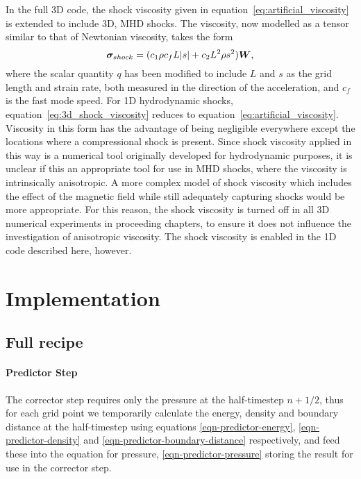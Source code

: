 In the full 3D code, the shock viscosity given in equation~\ref{eq:artificial_viscosity} is extended to include 3D, MHD shocks. The viscosity, now modelled as a tensor similar to that of Newtonian viscosity, takes the form
\begin{equation}
  \label{eq:3d_shock_viscosity}
{\bm \sigma}_{shock} = (c_1 \rho c_f L |s| + c_2 L^2 \rho s^2) {\bm W},
\end{equation}
where the scalar quantity $q$ has been modified to include $L$ and $s$ as the grid length and strain rate, both measured in the direction of the acceleration, and $c_f$ is the fast mode speed. For 1D hydrodynamic shocks, equation~\ref{eq:3d_shock_viscosity} reduces to equation~\ref{eq:artificial_viscosity}. Viscosity in this form has the advantage of being negligible everywhere except the locations where a compressional shock is present. Since shock viscosity applied in this way is a numerical tool originally developed for hydrodynamic purposes, it is unclear if this an appropriate tool for use in MHD shocks, where the viscosity is intrinsically anisotropic. A more complex model of shock viscosity which includes the effect of the magnetic field while still adequately capturing shocks would be more appropriate. For this reason, the shock viscosity is turned off in all 3D numerical experiments in proceeding chapters, to ensure it does not influence the investigation of anisotropic viscosity. The shock viscosity is enabled in the 1D code described here, however.

\section{Implementation}
\subsection{Full recipe}
\paragraph{Predictor Step}
The corrector step requires only the pressure at the half-timestep $n+1/2$, thus for each grid point we temporarily calculate the energy, density and boundary distance at the half-timestep using equations \eqref{eqn-predictor-energy}, \eqref{eqn-predictor-density} and \eqref{eqn-predictor-boundary-distance} respectively, and feed these into the equation for pressure, \eqref{eqn-predictor-pressure} storing the result for use in the corrector step.

